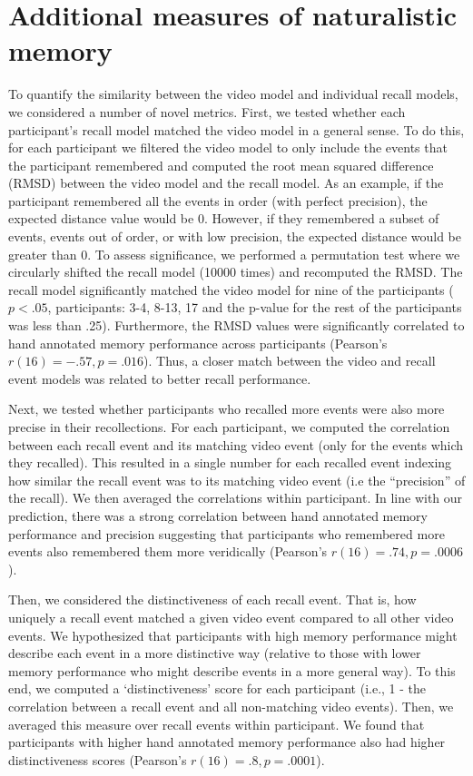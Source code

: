 \documentclass{article}
\begin{document}
\section*{Additional measures of naturalistic memory}
To quantify the similarity between the video model and individual recall models, we considered a number of novel metrics.  First, we tested whether each participant's recall model matched the video model in a general sense. To do this, for each participant we filtered the video model to only include the events that the participant remembered and computed the root mean squared difference (RMSD) between the video model and the recall model. As an example, if the participant remembered all the events in order (with perfect precision), the expected distance value would be 0. However, if they remembered a subset of events, events out of order, or with low precision, the expected distance would be greater than 0. To assess significance, we performed a permutation test where we circularly shifted the recall model (10000 times) and recomputed the RMSD. The recall model significantly matched the video model for nine of the participants ($p<.05$, participants: 3-4, 8-13, 17 and the p-value for the rest of the participants was less than .25). Furthermore, the RMSD values were significantly correlated to hand annotated memory performance across participants (Pearson's $r(16)=-.57, p=.016$). Thus, a closer match between the video and recall event models was related to better recall performance.

Next, we tested whether participants who recalled more events were also more precise in their recollections. For each participant, we computed the correlation between each recall event and its matching video event (only for the events which they recalled). This resulted in a single number for each recalled event indexing how similar the recall event was to its matching video event (i.e the ``precision'' of the recall). We then averaged the correlations within participant. In line with our prediction, there was a strong correlation between hand annotated memory performance and precision suggesting that participants who remembered more events also remembered them more veridically (Pearson's $r(16)=.74, p=.0006$).

Then, we considered the distinctiveness of each recall event. That is, how uniquely a recall event matched a given video event compared to all other video events. We hypothesized that participants with high memory performance might describe each event in a more distinctive way (relative to those with lower memory performance who might describe events in a more general way). To this end, we computed a `distinctiveness' score for each participant (i.e., 1 - the correlation between a recall event and all non-matching video events).  Then, we averaged this measure over recall events within participant.  We found that participants with higher hand annotated memory performance also had higher distinctiveness scores (Pearson's $r(16)=.8, p=.0001$).
\end{document}
